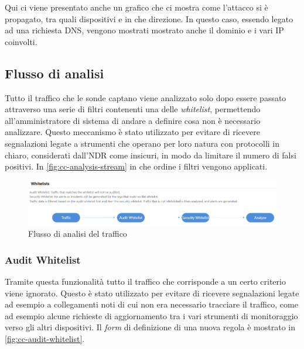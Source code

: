 Qui ci viene presentato anche un grafico che ci mostra come l'attacco si è propagato, tra quali dispositivi e in che direzione. In questo caso, essendo legato ad una richiesta DNS, vengono mostrati mostrato anche il dominio e i vari IP coinvolti.

\subsection{Flusso di analisi}

Tutto il traffico che le sonde captano viene analizzato solo dopo essere passato attraverso una serie di filtri contenenti una delle \emph{whitelist}, permettendo all'amministratore di sistema di andare a definire cosa non è necessario analizzare. Questo meccanismo è stato utilizzato per evitare di ricevere segnalazioni legate a strumenti che operano per loro natura con protocolli in chiaro, considerati dall'NDR come insicuri, in modo da limitare il numero di falsi positivi. In \autoref{fig:cc-analysis-stream} in che ordine i filtri vengono applicati.

\begin{figure}[!htbp]
    \centering
    \includegraphics[width=0.9\linewidth]{images/ndr/analysis-stream.png}
    \caption{Flusso di analisi del traffico}
    \label{fig:cc-analysis-stream}
\end{figure}

\subsubsection{Audit Whitelist}

Tramite questa funzionalità tutto il traffico che corrisponde a un certo criterio viene ignorato. Questo è stato utilizzato per evitare di ricevere segnalazioni legate ad esempio a collegamenti noti di cui non era necessario tracciare il traffico, come ad esempio alcune richieste di aggiornamento tra i vari strumenti di monitoraggio verso gli altri dispositivi. Il \emph{form} di definizione di una nuova regola è mostrato in \autoref{fig:cc-audit-whitelist}.

